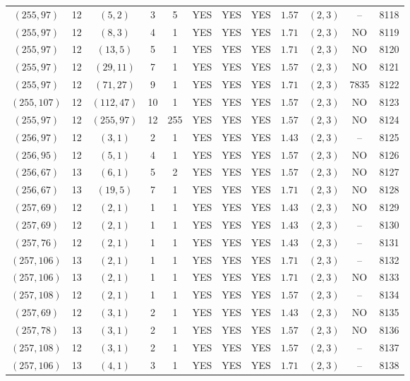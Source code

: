 \begin{longtable}{|c|c|c|c|c|c|c|c|c|c|c|c|}
$(255,97)$ & 12 & $(5,2)$ & 3 & 5 & YES & YES & YES & $1.57$ & $(2,3)$ & -- & 8118\\
$(255,97)$ & 12 & $(8,3)$ & 4 & 1 & YES & YES & YES & $1.71$ & $(2,3)$ & NO & 8119\\
$(255,97)$ & 12 & $(13,5)$ & 5 & 1 & YES & YES & YES & $1.71$ & $(2,3)$ & NO & 8120\\
$(255,97)$ & 12 & $(29,11)$ & 7 & 1 & YES & YES & YES & $1.57$ & $(2,3)$ & NO & 8121\\
$(255,97)$ & 12 & $(71,27)$ & 9 & 1 & YES & YES & YES & $1.71$ & $(2,3)$ & 7835 & 8122\\
$(255,107)$ & 12 & $(112,47)$ & 10 & 1 & YES & YES & YES & $1.57$ & $(2,3)$ & NO & 8123\\
$(255,97)$ & 12 & $(255,97)$ & 12 & 255 & YES & YES & YES & $1.57$ & $(2,3)$ & NO & 8124\\
$(256,97)$ & 12 & $(3,1)$ & 2 & 1 & YES & YES & YES & $1.43$ & $(2,3)$ & -- & 8125\\
$(256,95)$ & 12 & $(5,1)$ & 4 & 1 & YES & YES & YES & $1.57$ & $(2,3)$ & NO & 8126\\
$(256,67)$ & 13 & $(6,1)$ & 5 & 2 & YES & YES & YES & $1.57$ & $(2,3)$ & NO & 8127\\
$(256,67)$ & 13 & $(19,5)$ & 7 & 1 & YES & YES & YES & $1.71$ & $(2,3)$ & NO & 8128\\
$(257,69)$ & 12 & $(2,1)$ & 1 & 1 & YES & YES & YES & $1.43$ & $(2,3)$ & NO & 8129\\
$(257,69)$ & 12 & $(2,1)$ & 1 & 1 & YES & YES & YES & $1.43$ & $(2,3)$ & -- & 8130\\
$(257,76)$ & 12 & $(2,1)$ & 1 & 1 & YES & YES & YES & $1.43$ & $(2,3)$ & -- & 8131\\
$(257,106)$ & 13 & $(2,1)$ & 1 & 1 & YES & YES & YES & $1.71$ & $(2,3)$ & -- & 8132\\
$(257,106)$ & 13 & $(2,1)$ & 1 & 1 & YES & YES & YES & $1.71$ & $(2,3)$ & NO & 8133\\
$(257,108)$ & 12 & $(2,1)$ & 1 & 1 & YES & YES & YES & $1.57$ & $(2,3)$ & -- & 8134\\
$(257,69)$ & 12 & $(3,1)$ & 2 & 1 & YES & YES & YES & $1.43$ & $(2,3)$ & NO & 8135\\
$(257,78)$ & 13 & $(3,1)$ & 2 & 1 & YES & YES & YES & $1.57$ & $(2,3)$ & NO & 8136\\
$(257,108)$ & 12 & $(3,1)$ & 2 & 1 & YES & YES & YES & $1.57$ & $(2,3)$ & -- & 8137\\
$(257,106)$ & 13 & $(4,1)$ & 3 & 1 & YES & YES & YES & $1.71$ & $(2,3)$ & -- & 8138\\

\end{longtable}
